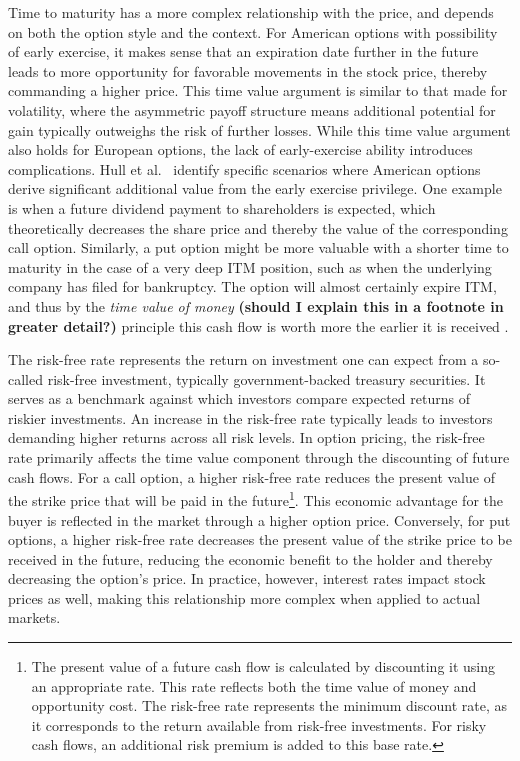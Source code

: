 \documentclass[english,12pt,a4paper,pdftex,sci,utf8]{aaltothesis}
\begin{document}
Time to maturity has a more complex relationship with the price, and depends on both the option style and the context. For American options with possibility of early exercise, it makes sense that an expiration date further in the future leads to more opportunity for favorable movements in the stock price, thereby commanding a higher price. This time value argument is similar to that made for volatility, where the asymmetric payoff structure means additional potential for gain typically outweighs the risk of further losses. While this time value argument also holds for European options, the lack of early-exercise ability introduces complications. Hull et al.\ \cite{hull2013fundamentals} identify specific scenarios where American options derive significant additional value from the early exercise privilege. One example is when a future dividend payment to shareholders is expected, which theoretically decreases the share price and thereby the value of the corresponding call option. Similarly, a put option might be more valuable with a shorter time to maturity in the case of a very deep ITM position, such as when the underlying company has filed for bankruptcy. The option will almost certainly expire ITM, and thus by the \emph{time value of money} \textbf{(should I explain this in a footnote in greater detail?)} principle this cash flow is worth more the earlier it is received \cite{berk2007corporate}.

The risk-free rate represents the return on investment one can expect from a so-called risk-free investment, typically government-backed treasury securities. It serves as a benchmark against which investors compare expected returns of riskier investments. An increase in the risk-free rate typically leads to investors demanding higher returns across all risk levels. In option pricing, the risk-free rate primarily affects the time value component through the discounting of future cash flows. For a call option, a higher risk-free rate reduces the present value of the strike price that will be paid in the future\footnote{The present value of a future cash flow is calculated by discounting it using an appropriate rate. This rate reflects both the time value of money and opportunity cost. The risk-free rate represents the minimum discount rate, as it corresponds to the return available from risk-free investments. For risky cash flows, an additional risk premium is added to this base rate.}. This economic advantage for the buyer is reflected in the market through a higher option price. Conversely, for put options, a higher risk-free rate decreases the present value of the strike price to be received in the future, reducing the economic benefit to the holder and thereby decreasing the option's price. In practice, however, interest rates impact stock prices as well, making this relationship more complex when applied to actual markets.
\end{document}
